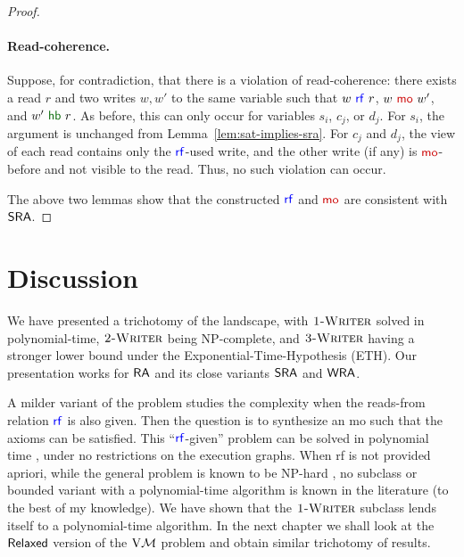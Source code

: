 \begin{proof}
\paragraph*{Read-coherence.}
Suppose, for contradiction, that there is a violation of read-coherence: there exists a read $r$ and two writes $w, w'$ to the same variable such that $w~\rf~r$, $w~\mo~w'$, and $w'~\hb~r$. As before, this can only occur for variables $s_i$, $c_j$, or $d_j$. For $s_i$, the argument is unchanged from Lemma~\ref{lem:sat-implies-sra}. For $c_j$ and $d_j$, the view of each read contains only the $\rf$-used write, and the other write (if any) is $\mo$-before and not visible to the read. Thus, no such violation can occur.

The above two lemmas show that the constructed $\rf$ and $\mo$ are consistent with $\mathsf{SRA}$. 
\end{proof}

\smallskip
\section{Discussion}\label{ra-discuss}

We have presented a trichotomy of the landscape, with $\textsc{1-Writer}$ solved in polynomial-time, $\textsc{2-Writer}$ being NP-complete, and $\textsc{3-Writer}$ having a stronger lower bound under the Exponential-Time-Hypothesis (ETH). Our presentation works for $\mathsf{RA}$ and its close variants $\mathsf{SRA}$ and $\mathsf{WRA}$.

A milder variant of the problem studies the complexity when the reads-from relation $\rf$ is also given. Then the question is to synthesize an mo such that the axioms can be satisfied. This “$\rf$-given” problem can be solved in polynomial time \cite{Tunc2023}, under no restrictions on the execution graphs. When rf is not provided
apriori, while the general problem is known to be NP-hard \cite{gibbons}, no subclass or
bounded variant with a polynomial-time algorithm is known in the literature (to
the best of my knowledge). We have shown that the $\textsc{1-Writer}$ subclass lends itself to a polynomial-time algorithm. In the next chapter we shall look at the $\mathsf{Relaxed}$ version of the $\mathrm{V}\mathcal{M}$ problem and obtain similar trichotomy of results. 
